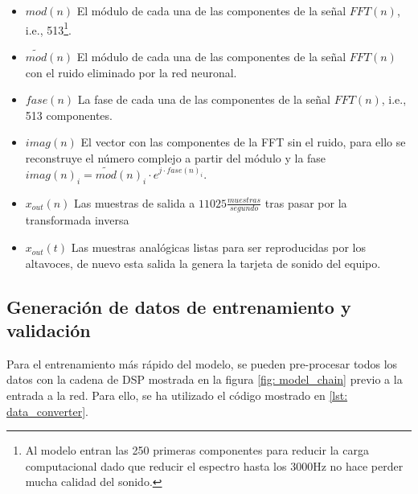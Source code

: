 \begin{itemize}
\begin{center}
 	\end{center}
 	\item $mod(n)$ El módulo de cada una de las componentes de la señal $FFT(n)$, i.e., 513\footnote{Al modelo entran las 250 primeras componentes para reducir la carga computacional dado que reducir el espectro hasta los 3000Hz no hace perder mucha calidad del sonido.}.
 	\item $\widetilde{mod}(n)$ El módulo de cada una de las componentes de la señal $FFT(n)$ con el ruido eliminado por la red neuronal.
 	\item $fase(n)$ La fase de cada una de las componentes de la señal $FFT(n)$, i.e., 513 componentes.
 	\item $imag(n)$ El vector con las componentes de la \gls{FFT} sin el ruido, para ello se reconstruye el número complejo a partir del módulo y la fase $imag(n)_i = \widetilde{mod}(n)_i\cdot e^{j\cdot fase(n)_i}$.
 	\item $x_{out}(n)$ Las muestras de salida a $11025\frac{muestras}{segundo}$ tras pasar por la transformada inversa
 	\item $x_{out}(t)$ Las muestras analógicas listas para ser reproducidas por los altavoces, de nuevo esta salida la genera la tarjeta de sonido del equipo.
\end{itemize}

\subsection{Generación de datos de entrenamiento y validación}
Para el entrenamiento más rápido del modelo, se pueden pre-procesar todos los datos con la cadena de \gls{DSP} mostrada en la figura \ref{fig: model_chain} previo a la entrada a la red. Para ello, se ha utilizado el código mostrado en \ref{lst: data_converter}.

